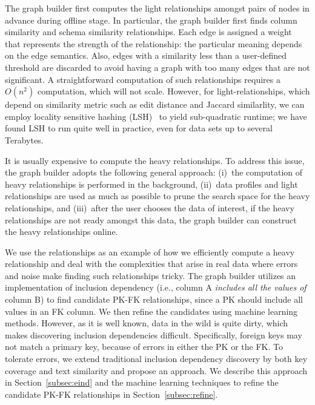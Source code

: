 The graph builder first computes the light relationships amongst pairs of
nodes in advance during offline stage. In particular, the graph builder first finds column similarity and
schema similarity relationships.  Each edge is assigned a weight that represents
the strength of the relationship: the particular meaning depends on the edge
semantics. Also, edges with a similarity less than a user-defined threshold are
discarded to avoid having a graph with too many edges that are not significant.
A straightforward computation of such relationships requires a $O(n^2)$
computation, which will not scale. However, for light-relationships, which depend on similarity metric
such as edit distance and Jaccard similarlity, we can employ locality sensitive hashing
(LSH)~\cite{DBLP:conf/compgeom/DatarIIM04} to yield sub-quadratic runtime; we have found LSH to run quite well in practice, even for data sets up to several Terabytes.

It is usually expensive to compute the heavy relationships. To address this
issue, the graph builder adopts the following general approach: (i)~the
computation of heavy relationships is performed in the background, (ii)~data
profiles and light relationships are used as much as possible to prune the
search space for the heavy relationships, and (iii)~after the user chooses the data of
interest, if the heavy relationships are not ready amongst this data, the graph builder can construct the heavy relationships online.

We use the \pkfk relationships as an example of how
we efficiently compute a heavy relationship and deal with the complexities that arise in real data where errors and noise make finding
such relationships tricky. The graph builder utilizes an
implementation of inclusion dependency (i.e., column A {\it includes all the values of} column B) to find candidate PK-FK relationships, since a PK should include all values in an FK column.  We then 
 refine the candidates using machine learning methods. However,
as it is well known, data in the wild is quite dirty, which makes discovering
inclusion dependencies difficult. Specifically, foreign keys may not match a
primary key, because of errors in either the PK or the FK. To tolerate errors,
we extend traditional inclusion dependency discovery by both key coverage and
text similarity and propose an \emph{\eind} approach. 
We describe this approach in Section~\ref{subsec:eind} and the machine learning
techniques to refine the candidate PK-FK relationships in Section~\ref{subsec:refine}.


